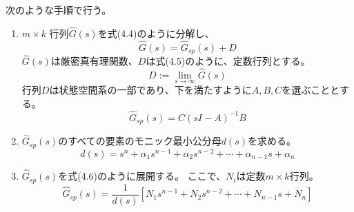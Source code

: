 \documentclass{jsarticle}
\begin{document}
次のような手順で行う。
\begin{enumerate}
  \item $m\times k$ 行列$\hat{G} ( s )$を式(4.4)のように分解し、
  \begin{equation}
    \hat{G} ( s ) = \hat{G}_{sp}( s )+D \tag{4.4}
  \end{equation}
  $\hat{G} ( s )$は厳密真有理関数、$D$は式(4.5)のように、定数行列とする。
  \begin{equation}
    D := \lim_{s \rightarrow \infty}{\hat{G} ( s )} \tag{4.5}
  \end{equation}
  行列$D$は状態空間系の一部であり、下を満たすように$A,B,C$を選ぶこととする。
  \begin{equation}
    \hat{G}_{sp}( s ) = C(sI-A)^{-1}B
  \end{equation}

  \item  $\hat{G}_{sp}( s )$のすべての要素のモニック最小公分母$d(s)$を求める。
  \begin{equation}
    d(s)=s^n + \alpha_1s^{n-1} + \alpha_2 s^{n-2}+\cdots+\alpha_{n-1}s+\alpha_n
  \end{equation}
  
  \item $\hat{G}_{sp}( s )$を式(4.6)のように展開する。
  ここで、$N_i$は定数$m \times k$行列。
  \begin{equation}
    \hat{G}_{sp}( s ) = \frac{1}{d(s)}\left[ N_1s^{n-1} + N_2s^{n-2} + \cdots + N_{n-1}s + N_n \right] \tag{4.6}
  \end{equation}


\end{enumerate}
\end{document}
